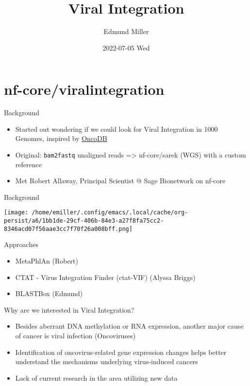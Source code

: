 \documentclass[bigger]{beamer}
\author{Edmund Miller}
\date{2022-07-05 Wed}
\title{Viral Integration}
\begin{document}
\maketitle

\section*{nf-core/viralintegration}
\label{sec:org4d4fbbc}

\begin{frame}[label={sec:orgb1869e7},fragile]{Background}
 \begin{itemize}
\item Started out wondering if we could look for Viral Integration in 1000 Genomes, inspired by \href{http://oncodb.org/}{OncoDB}
\item Original: \texttt{bam2fastq} unaligned reads => nf-core/sarek (WGS) with a custom
reference
\item Met Robert Allaway, Principal Scientist @ Sage Bionetwork on nf-core
\end{itemize}
\end{frame}

\begin{frame}[label={sec:org69ce5b1}]{Background}
\begin{center}
\texttt{[image: /home/emiller/.config/emacs/.local/cache/org-persist/a6/1bb1de-29cf-406b-84e3-a27f8fa75cc2-8346acd07f56aae3cc7f70f26a008bff.png]}
\end{center}
\end{frame}

\begin{frame}[label={sec:orgf4c511d}]{Approaches}
\begin{itemize}
\item MetaPhlAn (Robert)
\item CTAT - Virus Integration Finder (ctat-VIF) (Alyssa Briggs)
\item BLASTBox (Edmund)
\end{itemize}
\end{frame}

\begin{frame}[label={sec:orgad28565}]{Why are we interested in Viral Integration?}
\begin{itemize}
\item Besides aberrant DNA methylation or RNA expression, another major cause of
cancer is viral infection (Oncoviruses)
\item Identification of oncovirus-related gene expression changes helps better
understand the mechanisms underlying virus-induced cancers
\item Lack of current research in the area utilizing new data
\end{itemize}
\end{frame}
\end{document}
